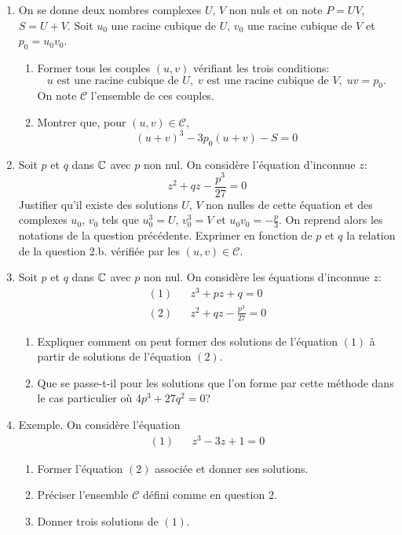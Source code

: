 \begin{enumerate}
 \item On se donne deux nombres complexes $U$, $V$ non nuls et on note $P=UV$, $S=U+V$. Soit $u_0$ une racine cubique de $U$, $v_0$ une racine cubique de $V$ et $p_0=u_0v_0$.
\begin{enumerate}
 \item Former tous les couples $(u,v)$ vérifiant les trois conditions: 
\[
 u \text{ est une racine cubique de } U, \; v \text{ est une racine cubique de } V, \; uv = p_0.
\]
On note $\mathcal{C}$ l'ensemble de ces couples.
\item Montrer que, pour $(u,v)\in \mathcal{C}$,
\begin{displaymath}
 (u+v)^3 -3p_0(u+v) -S = 0
\end{displaymath}
\end{enumerate}
\item Soit $p$ et $q$ dans $\mathbb{C}$ avec $p$ non nul. On considère l'équation d'inconnue $z$:
\begin{displaymath}
 z^2+qz-\frac{p^3}{27} = 0
\end{displaymath}
Justifier qu'il existe des solutions $U$, $V$ non nulles de cette équation et des complexes $u_0$, $v_0$ tels que $u_0^3=U$, $v_0^3=V$ et $u_0v_0=-\frac{p}{3}$. On reprend alors les notations de la question précédente.\newline
Exprimer en fonction de $p$ et $q$ la relation de la question 2.b. vérifiée par les $(u,v)\in\mathcal{C}$.
\item Soit $p$ et $q$ dans $\mathbb{C}$ avec $p$ non nul. On considère les équations d'inconnue $z$:
\begin{align*}
 (1)& &z^3+pz+q = 0 \\
 (2)& &z^2+qz-\frac{p^3}{27} = 0 
\end{align*}
\begin{enumerate}
 \item Expliquer comment on peut former des solutions de l'équation $(1)$ à partir de solutions de l'équation $(2)$.
 \item Que se passe-t-il pour les solutions que l'on forme par cette méthode dans le cas particulier où $4p^3+27q^2=0$? 
\end{enumerate}
\item Exemple. On considère l'équation
\begin{align*}
 (1)& &z^3-3z+1 = 0
\end{align*}
\begin{enumerate}
 \item Former l'équation $(2)$ associée et donner ses solutions.
 \item Préciser l'ensemble $\mathcal{C}$ défini comme en question 2.
 \item Donner trois solutions de $(1)$.
\end{enumerate}
\end{enumerate}

